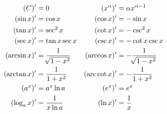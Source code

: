 \documentclass{ctexbook}
\begin{document}
\begin{proposition}[常见导数]
    \begin{align*}
        (C)^\prime &=0 &
        (x^\alpha)^\prime &=\alpha x^{\alpha - 1}\\
        (\sin x)^\prime &= \cos x &
        (\cos x)^\prime &=-\sin x\\
        (\tan x)^\prime &= \sec^2 x &
        (\cot x)^\prime &= -\csc^2 x \\
        (\sec x)^\prime &= \tan x \sec x &
        (\csc x)^\prime &= -\cot x \csc x \\
        (\arcsin x)^\prime &= \frac{1}{\sqrt[]{1-x^2}} &
        (\arccos x)^\prime &= -\frac{1}{\sqrt[]{1-x^2}} \\
        (\arctan x)^\prime &= \frac{1}{1+x^2} &
        (\textnormal{arc}\cot x)^\prime &= -\frac{1}{1+x^2} \\
        (a^x)^\prime &= a^x\ln a &
        (e^x)^\prime &= e^x \\
        (\log_a x)^\prime &= \frac{1}{x\ln a}&
        (\ln x)^\prime &=\frac{1}{x}
    \end{align*}
\end{proposition}
\end{document}
